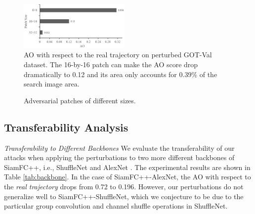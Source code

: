 \documentclass[journal]{IEEEtran}
\newcommand{\ie}{i.e.}
\begin{document}
\begin{figure}[t!]
  \begin{center}
    \includegraphics[width=0.48\textwidth]{images/patch_size/patch_size.png}
  \end{center}
  \caption{AO with respect to the real trajectory on perturbed GOT-Val dataset. The 16-by-16 patch can make the AO score drop dramatically to 0.12 and its area only accounts for 0.39\% of the search image area.}
  \label{fig:patch_size_table}
\end{figure}

\begin{figure}
  \centering
  \caption{Adversarial patches of different sizes.}
  \label{fig:patch_size_vis}
\end{figure}

\subsection{Transferability Analysis}

\textit{Transferability to Different Backbones} We evaluate the transferability of our attacks when applying the perturbations to two more different backbones of SiamFC++, \ie, ShuffleNet \cite{ShuffleNet} and AlexNet \cite{AlexNet}.
The experimental results are shown in Table \ref{tab:backbone}. In the case of SiamFC++-AlexNet, the AO with respect to the \textit{real trajectory} drops from 0.72 to 0.196. However, our perturbations do not generalize well to SiamFC++-ShuffleNet, which we conjecture to be due to the particular group convolution and channel shuffle operations in ShuffleNet.
\end{document}

